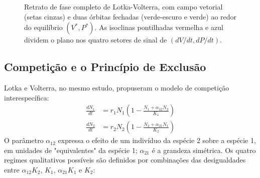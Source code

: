 \begin{figure}[htbp]
\centering
{}
\caption{Retrato de fase completo de Lotka-Volterra, com campo vetorial (setas cinzas) e duas órbitas fechadas (verde-escuro e verde) ao redor do equilíbrio $(V^*, P^*)$. As isoclinas pontilhadas vermelha e azul dividem o plano nos quatro setores de sinal de $(dV/dt, dP/dt)$.}
\label{fig:10-lv-campo}
\end{figure}

\subsection{Competição e o Princípio de Exclusão}
\label{sub:image10-competicao}

Lotka e Volterra, no mesmo estudo, propuseram o modelo de competição interespecífica:
\begin{align}
\frac{dN_1}{dt} &= r_1 N_1 \left(1 - \frac{N_1 + \alpha_{12} N_2}{K_1}\right) \\
\frac{dN_2}{dt} &= r_2 N_2 \left(1 - \frac{N_2 + \alpha_{21} N_1}{K_2}\right)
\end{align}
O parâmetro $\alpha_{12}$ expressa o efeito de um indivíduo da espécie 2
sobre a espécie 1, em unidades de "equivalentes" da espécie 1; $\alpha_{21}$
é a grandeza simétrica. Os quatro regimes qualitativos possíveis são definidos
por combinações das desigualdades entre $\alpha_{12} K_2$, $K_1$, $\alpha_{21}
K_1$ e $K_2$:


